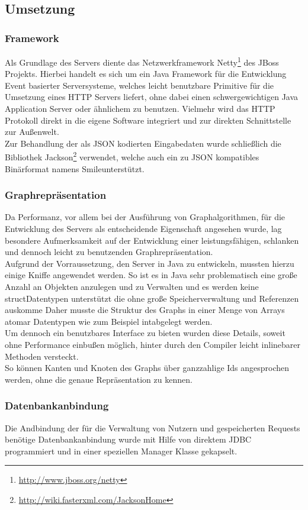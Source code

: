 \subsection*{Umsetzung}
\subsubsection*{Framework}
Als Grundlage des Servers diente das Netzwerkframework Netty\footnote{\url{http://www.jboss.org/netty}} des JBoss Projekts. Hierbei handelt es sich um ein Java Framework für die Entwicklung Event basierter Serversysteme, welches leicht benutzbare Primitive für die Umsetzung eines HTTP Servers liefert, ohne dabei einen schwergewichtigen Java Application Server oder ähnlichem zu benutzen. Vielmehr wird das HTTP Protokoll direkt in die eigene Software integriert und zur direkten Schnittstelle zur Außenwelt.\\
Zur Behandlung der als JSON kodierten Eingabedaten wurde schließlich die Bibliothek Jackson\footnote{\url{http://wiki.fasterxml.com/JacksonHome}} verwendet, welche auch ein zu JSON kompatibles Binärformat namens \glqq Smile\grqq unterstützt.
\subsubsection*{Graphrepräsentation}
Da Performanz, vor allem bei der Ausführung von Graphalgorithmen, für die Entwicklung des Servers als entscheidende Eigenschaft angesehen wurde, lag besondere Aufmerksamkeit auf der Entwicklung einer leistungsfähigen, schlanken und dennoch leicht zu benutzenden Graphrepräsentation.\\
Aufgrund der Vorraussetzung, den Server in Java zu entwickeln, mussten hierzu einige Kniffe angewendet werden.
So ist es in Java sehr problematisch eine große Anzahl an Objekten anzulegen und zu Verwalten und es werden keine  \glqq struct\grqq Datentypen unterstützt die ohne große Speicherverwaltung und Referenzen auskomme
Daher musste die Struktur des Graphs in einer Menge von Arrays atomar Datentypen wie zum Beispiel \glqq int\grqq abgelegt werden.\\
Um dennoch ein benutzbares Interface zu bieten wurden diese Details, soweit ohne Performance einbußen möglich,  hinter durch den Compiler leicht inlinebarer Methoden versteckt.\\
So können Kanten und Knoten des Graphs über ganzzahlige Ids angesprochen werden, ohne die genaue Repräsentation zu kennen.
\subsubsection*{Datenbankanbindung}
Die Andbindung der für die Verwaltung von Nutzern und gespeicherten Requests benötige Datenbankanbindung wurde mit Hilfe von direktem JDBC programmiert und in einer speziellen Manager Klasse gekapselt.
